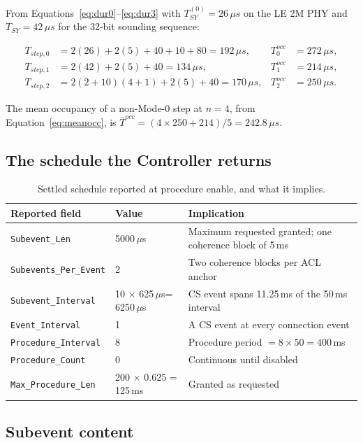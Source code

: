 \documentclass[11pt,a4paper]{article}
\newcommand{\us}{\,\ensuremath{\upmu}s}
\newcommand{\code}[1]{\texttt{\small #1}}
\newcommand{\Tsy}{T_{SY}}
\providecommand{\upmu}{\mu}
\begin{document}
From Equations~\eqref{eq:dur0}--\eqref{eq:dur3} with $\Tsy^{(0)} = 26\us$ on the LE 2M PHY and
$\Tsy = 42\us$ for the 32-bit sounding sequence:

\begin{align*}
T_{step,0} &= 2(26) + 2(5) + 40 + 10 + 80 = 192\us, & T^{occ}_0 &= 272\us,\\
T_{step,1} &= 2(42) + 2(5) + 40 = 134\us,           & T^{occ}_1 &= 214\us,\\
T_{step,2} &= 2(2+10)(4+1) + 2(5) + 40 = 170\us,    & T^{occ}_2 &= 250\us.
\end{align*}

The mean occupancy of a non-Mode-0 step at $n = 4$, from Equation~\eqref{eq:meanocc}, is
$\bar{T}^{occ} = (4 \times 250 + 214)/5 = 242.8\us$.

\subsection{The schedule the Controller returns}

\begin{table}[h]
\caption{Settled schedule reported at procedure enable, and what it implies.}
\label{tab:wex-out}
\centering\small
\begin{tabular}{@{}L{40mm}L{28mm}L{62mm}@{}}
\toprule
Reported field & Value & Implication \\
\midrule
\code{Subevent\_Len} & 5000\us & Maximum requested granted; one coherence block of 5\,ms \\
\code{Subevents\_Per\_Event} & 2 & Two coherence blocks per ACL anchor \\
\code{Subevent\_Interval} & 10 $\times$ 625\us = 6250\us & CS event spans 11.25\,ms of the 50\,ms interval \\
\code{Event\_Interval} & 1 & A CS event at every connection event \\
\code{Procedure\_Interval} & 8 & Procedure period $= 8 \times 50 = 400$\,ms \\
\code{Procedure\_Count} & 0 & Continuous until disabled \\
\code{Max\_Procedure\_Len} & 200 $\times$ 0.625 = 125\,ms & Granted as requested \\
\bottomrule
\end{tabular}
\end{table}

\subsection{Subevent content}
\end{document}
